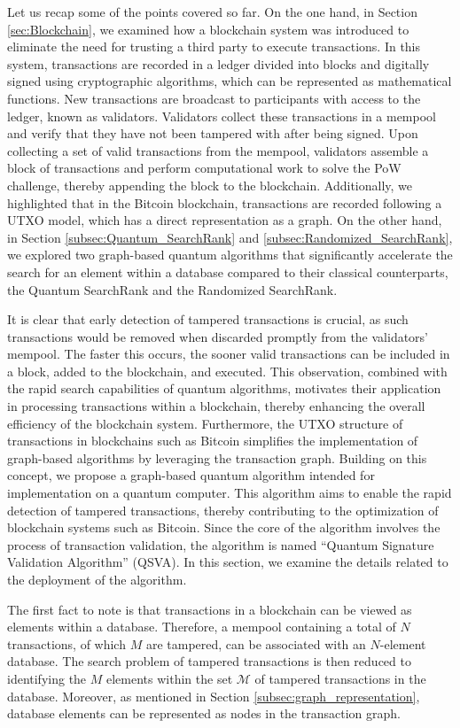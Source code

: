 \documentclass[nofootinbib,aps,prd,reprint,superscriptaddress,floatfix]{revtex4-2}
\begin{document}
Let us recap some of the points covered so far. On the one hand, in Section \ref{sec:Blockchain}, we examined how a blockchain system was introduced to eliminate the need for trusting a third party to execute transactions. In this system, transactions are recorded in a ledger divided into blocks and digitally signed using cryptographic algorithms, which can be represented as mathematical functions. New transactions are broadcast to participants with access to the ledger, known as validators. Validators collect these transactions in a mempool and verify that they have not been tampered with after being signed. Upon collecting a set of valid transactions from the mempool, validators assemble a block of transactions and perform computational work to solve the PoW challenge, thereby appending the block to the blockchain. Additionally, we highlighted that in the Bitcoin blockchain, transactions are recorded following a UTXO model, which has a direct representation as a graph. On the other hand, in Section \ref{subsec:Quantum_SearchRank} and \ref{subsec:Randomized_SearchRank}, we explored two graph-based quantum algorithms that significantly accelerate the search for an element within a database compared to their classical counterparts, the Quantum SearchRank and the Randomized SearchRank. 

It is clear that early detection of tampered transactions is crucial, as such transactions would be removed when discarded promptly from the validators' mempool. The faster this occurs, the sooner valid transactions can be included in a block, added to the blockchain, and executed. This observation, combined with the rapid search capabilities of quantum algorithms, motivates their application in processing transactions within a blockchain, thereby enhancing the overall efficiency of the blockchain system. Furthermore, the UTXO structure of transactions in blockchains such as Bitcoin simplifies the implementation of graph-based algorithms by leveraging the transaction graph. Building on this concept, we propose a graph-based quantum algorithm intended for implementation on a quantum computer. This algorithm aims to enable the rapid detection of tampered transactions, thereby contributing to the optimization of blockchain systems such as Bitcoin. Since the core of the algorithm involves the process of transaction validation, the algorithm is named ``Quantum Signature Validation Algorithm'' (QSVA). In this section, we examine the details related to the deployment of the algorithm.

The first fact to note is that transactions in a blockchain can be viewed as elements within a database. Therefore, a mempool containing a total of $N$ transactions, of which $M$ are tampered, can be associated with an $N$-element database. The search problem of tampered transactions is then reduced to identifying the $M$ elements within the set $\mathcal{M}$ of tampered transactions in the database. Moreover, as mentioned in Section \ref{subsec:graph_representation}, database elements can be represented as nodes in the transaction graph. 
\end{document}
